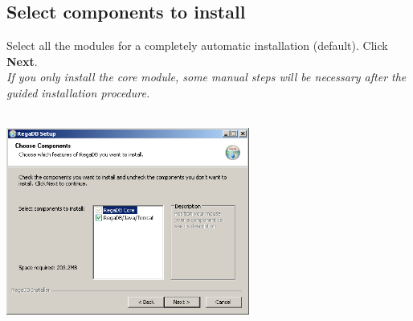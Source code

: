 \subsection{Select components to install}
Select all the modules for a completely automatic installation (default). Click \textbf{Next}.
\\\textit{If you only install the core module, some manual steps will be necessary after the guided installation procedure.}
\\
\vspace{0.5cm}~ \\ \centerline{\includegraphics[width=8cm] {pics/nsis/select_components_3.png}}

